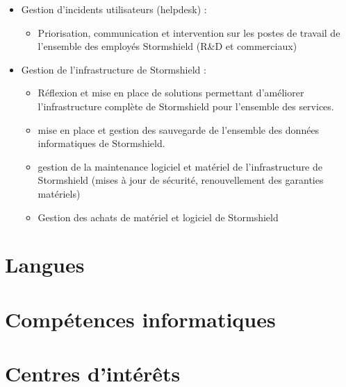                 {
                    \begin{itemize}
                    \item Gestion d'incidents utilisateurs (helpdesk) :
                             \begin{itemize}
                              \item Priorisation, communication et intervention sur les postes de travail de l'ensemble des employés Stormshield (R\&D et commerciaux)
                             \end{itemize}
                     \end{itemize}
                     \begin{itemize}
                     \item Gestion de l'infrastructure de Stormshield :
                             \begin{itemize}
                             \item Réflexion et mise en place de solutions permettant d'améliorer l'infrastructure complète de Stormshield pour l'ensemble des services.
                             \item mise en place et gestion des sauvegarde de l'ensemble des données informatiques de Stormshield.
                             \item gestion de la maintenance logiciel et matériel de l'infrastructure de Stormshield (mises à jour de sécurité, renouvellement des garanties matériels)
                             \item Gestion des achats de matériel et logiciel de Stormshield
                             \end{itemize}
                     \end{itemize}
		} 	
\section{Langues}
\section{Compétences informatiques}
\section{Centres d'intérêts}


